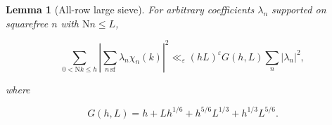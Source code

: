 \documentclass[reqno,a4paper,11pt]{amsart}
\newtheorem{lemma}{Lemma}[section]
\begin{document}
\begin{lemma}[All-row large sieve]

For arbitrary coefficients ${\lambda }_{n}$ supported on squarefree $n$ with $\mathrm{N}n\le L$,

\begin{equation}\label{eq:6}
\sum _{0<\mathrm{N}k\le h} {\left| \sum _{n\,\mathrm{sf}} {\lambda }_{n}{\chi }_{n}\left( k\right) \right| }^{2}{\ll }_{\varepsilon }{\left( hL\right) }^{\varepsilon }G\left( h,L\right) \sum _{n} {\left| {\lambda }_{n}\right| }^{2},
\end{equation}

where

\begin{equation}\label{eq:7}
G\left( h,L\right) =h+L{h}^{1/6}+{h}^{5/6}{L}^{1/3}+{h}^{1/3}{L}^{5/6}.
\end{equation}

\end{lemma}
\end{document}

